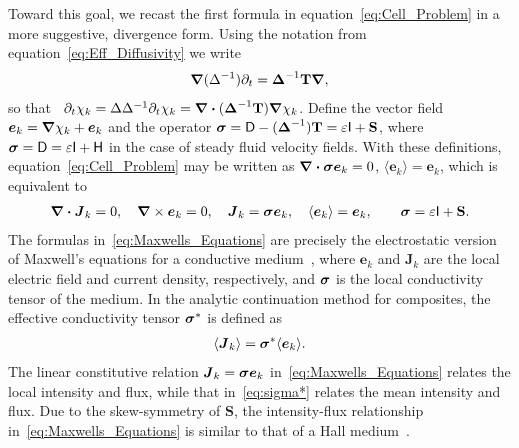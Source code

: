 \documentclass[leqno,onefignum,onetabnum]{siamltex1213}
\newcommand{\Tb}{\mathbf{T}}
\newcommand{\Sb}{\mathbf{S}}
\newcommand{\Dm}{\mathsf{D}}
\newcommand{\Hm}{\mathsf{H}}
\newcommand{\Ib}{\mathsf{I}}
\newcommand\bsig{\mbox{\boldmath${\sigma}$}}
\newcommand\bDelta{\mbox{\boldmath${\Delta}$}}
\newcommand\bnabla{\mbox{\boldmath${\nabla}$}}
\providecommand\bcdot{\boldsymbol{\cdot}}
\newcommand{\vecJ}{\boldsymbol{J}}
\newcommand{\vece}{\boldsymbol{e}}
\begin{document}
Toward this goal, we recast the first formula in
equation~\eqref{eq:Cell_Problem} in a more suggestive, divergence
form. Using 
the notation from equation~\eqref{eq:Eff_Diffusivity} we write 
%
\begin{align}%
  \bnabla (\Delta^{-1})\partial_t=\bDelta^{-1}\Tb\bnabla ,
\end{align}
%
so that~\cite{Fannjiang:SIAM_JAM:333}
$\partial_t\chi_k=\Delta\Delta^{-1}\partial_t\chi_k=\bnabla \bcdot(\bDelta^{-1}\Tb)\bnabla \chi_k$. Define the  
vector field $\vece _k=\bnabla \chi_k+\vece _k$ and the operator
$\bsig=\Dm-(\bDelta^{-1})\Tb=\varepsilon\Ib+\Sb$, where
$\bsig=\Dm=\varepsilon\Ib+\Hm$ in the case of steady fluid velocity
fields. With these definitions, equation~\eqref{eq:Cell_Problem} may
be written as  $\bnabla \bcdot\bsig\vece _k=0$, $\langle\vece _k\rangle=\vece _k$,
which is equivalent to    
%
\begin{align}\label{eq:Maxwells_Equations}    
  \bnabla \bcdot\vecJ_k=0, \quad
  \bnabla \times\vece _k=0, \quad
  \vecJ_k=\bsig\vece _k,\quad
  \langle\vece _k\rangle=\vece _k,\qquad
  \bsig%
       =\varepsilon\Ib+\Sb.
\end{align}
%
The formulas in~\eqref{eq:Maxwells_Equations} are precisely the
electrostatic version of Maxwell's equations for a conductive
medium~\cite{Golden:CMP-473}, where $\vece _k$ and $\vecJ_k$ are the
local 
electric field and current density, respectively, and $\bsig$ is the
local conductivity tensor of the medium. In the analytic continuation method for composites,
the effective conductivity tensor $\bsig^*$ is defined as
% 
\begin{align}\label{eq:sigma*}
  \langle\vecJ_k\rangle=\bsig^*\langle\vece _k\rangle.
\end{align}
%
The linear constitutive relation $\vecJ_k=\bsig\vece _k$
in~\eqref{eq:Maxwells_Equations} relates the local intensity and flux, 
while that in~\eqref{eq:sigma*} relates the mean intensity and
flux. Due to the skew-symmetry of $\Sb$, the intensity-flux
relationship in~\eqref{eq:Maxwells_Equations} is similar to that of a
Hall medium~\cite{Isichenko:JNS:1991:375}.
\end{document}
